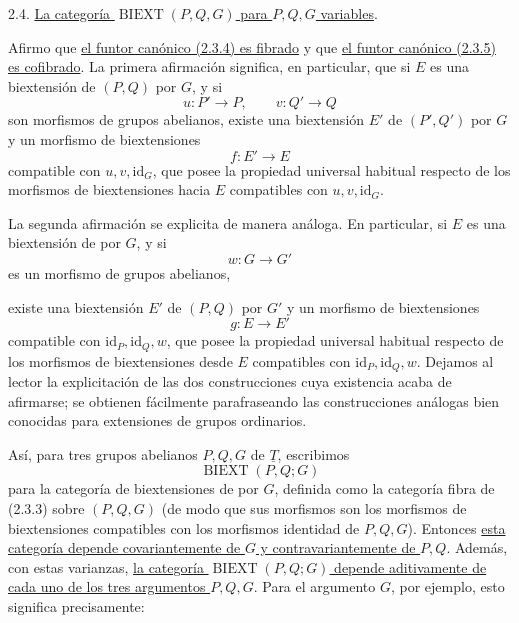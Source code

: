 2.4. \underline{La categoría $\operatorname{BIEXT}(P,Q,G)$ para
$P,Q,G$ variables}.

Afirmo que \underline{el funtor canónico (2.3.4) es fibrado} y que
\underline{el funtor canónico (2.3.5) es cofibrado}. La primera
afirmación significa, en particular, que si $E$ es una biextensión de
$(P,Q)$ por $G$, y si
\[
 u:P'\longrightarrow P,\qquad v:Q'\longrightarrow Q
\]
son morfismos de grupos abelianos, existe una biextensión $E'$ de
$(P',Q')$ por $G$ y un morfismo de biextensiones
\[
 f:E'\longrightarrow E
\]
compatible con $u,v,\mathrm{id}_G$, que posee la propiedad universal
habitual respecto de los morfismos de biextensiones hacia $E$
compatibles con $u,v,\mathrm{id}_G$.

La segunda afirmación se explicita de manera análoga. En particular,
si $E$ es una biextensión de  por $G$, y si
\[
 w:G\longrightarrow G'
\]
es un morfismo de grupos abelianos,


existe una biextensión $E'$ de $(P,Q)$ por $G'$ y un morfismo de
biextensiones
\[
 g:E\longrightarrow E'
\]
compatible con $\mathrm{id}_P,\mathrm{id}_Q,w$, que posee la propiedad
universal habitual respecto de los morfismos de biextensiones desde
$E$ compatibles con $\mathrm{id}_P,\mathrm{id}_Q,w$. Dejamos al lector
la explicitación de las dos construcciones cuya existencia acaba de
afirmarse; se obtienen fácilmente parafraseando las construcciones
análogas bien conocidas para extensiones de grupos ordinarios.

Así, para tres grupos abelianos $P,Q,G$ de $\underline T$, escribimos
\begin{equation}\tag{2.4.1}
 \operatorname{BIEXT}(P,Q;G)
\end{equation}
para la categoría de biextensiones de
 por $G$, definida como la categoría fibra de
(2.3.3) sobre $(P,Q,G)$ (de modo que sus morfismos son los morfismos
de biextensiones compatibles con los morfismos identidad de $P,Q,G$).
Entonces \underline{esta categoría depende covariantemente de $G$ y
contravariantemente de $P,Q$}. Además, con estas varianzas,
\underline{la categoría $\operatorname{BIEXT}(P,Q;G)$ depende
aditivamente de cada uno de los tres argumentos $P,Q,G$}. Para el
argumento $G$, por ejemplo, esto significa precisamente:

